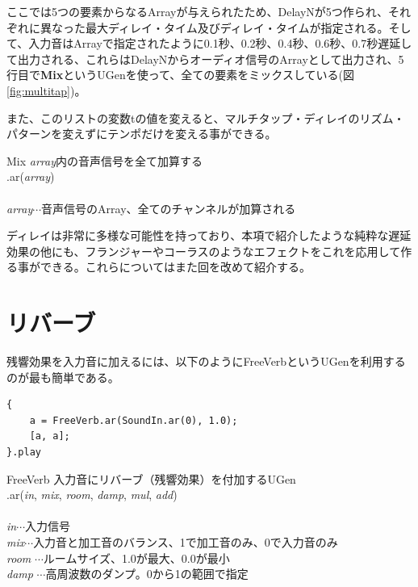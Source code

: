 \documentclass{jsarticle}
\begin{document}
ここでは5つの要素からなるArrayが与えられたため、DelayNが5つ作られ、それぞれに異なった最大ディレイ・タイム及びディレイ・タイムが指定される。そして、入力音はArrayで指定されたように0.1秒、0.2秒、0.4秒、0.6秒、0.7秒遅延して出力される、これらはDelayNからオーディオ信号のArrayとして出力され、5行目で{\bf Mix}というUGenを使って、全ての要素をミックスしている(図\ref{fig:multitap})。

また、このリストの変数tの値を変えると、マルチタップ・ディレイのリズム・パターンを変えずにテンポだけを変える事ができる。

\begin{itembox}[l]{Mix}
{\footnotesize 
{\it array}内の音声信号を全て加算する\\
.ar({\it array})\\\\
{\it array}$\cdots$音声信号のArray、全てのチャンネルが加算される\\
}
\end{itembox}

ディレイは非常に多様な可能性を持っており、本項で紹介したような純粋な遅延効果の他にも、フランジャーやコーラスのようなエフェクトをこれを応用して作る事ができる。これらについてはまた回を改めて紹介する。

\section{リバーブ}
残響効果を入力音に加えるには、以下のようにFreeVerbというUGenを利用するのが最も簡単である。

\begin{lstlisting}[caption=リバーブ, label=code:reverb]
{
	a = FreeVerb.ar(SoundIn.ar(0), 1.0);
	[a, a];
}.play
\end{lstlisting}

\begin{itembox}[l]{FreeVerb}
{\footnotesize 
入力音にリバーブ（残響効果）を付加するUGen\\
.ar({\it in}, {\it mix}, {\it room}, {\it damp}, {\it mul}, {\it add})\\\\
{\it in}$\cdots$入力信号\\
{\it mix}$\cdots$入力音と加工音のバランス、1で加工音のみ、0で入力音のみ\\
{\it room} $\cdots$ルームサイズ、1.0が最大、0.0が最小\\
{\it damp} $\cdots$高周波数のダンプ。0から1の範囲で指定\\
}
\end{itembox}
\end{document}
